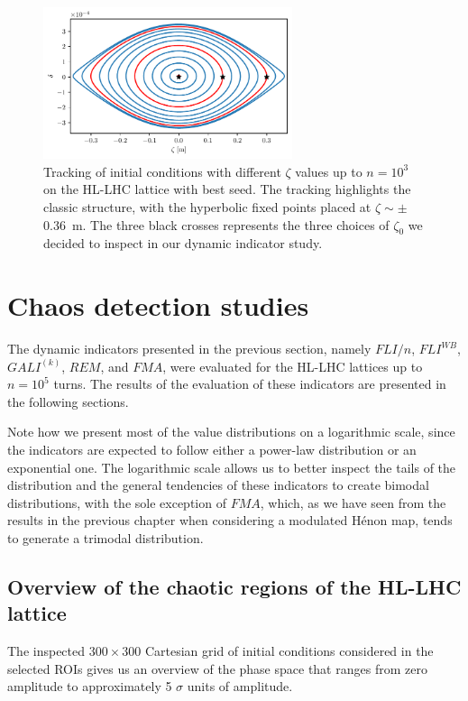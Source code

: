 \begin{figure}
    \centering
    \includegraphics[width=0.65\textwidth]{6_lhc_dynamic_indicators/figs/longitudinal.pdf}
    \caption{Tracking of initial conditions with different $\zeta$ values up to $n=10^3$ on the HL-LHC lattice with best seed. The tracking highlights the classic structure, with the hyperbolic fixed points placed at $\zeta \sim \pm$ \SI{0.36}{\meter}. The three black crosses represents the three choices of $\zeta_0$ we decided to inspect in our dynamic indicator study.}
    \label{fig:the_bunch}
\end{figure}

\section{Chaos detection studies} \label{sec:8:results}

The dynamic indicators presented in the previous section, namely $FLI/n$, $FLI^{WB}$, $GALI^{(k)}$, $REM$, and $FMA$, were evaluated for the HL-LHC lattices up to $n=10^5$ turns. The results of the evaluation of these indicators are presented in the following sections.

Note how we present most of the value distributions on a logarithmic scale, since the indicators are expected to follow either a power-law distribution or an exponential one. The logarithmic scale allows us to better inspect the tails of the distribution and the general tendencies of these indicators to create bimodal distributions, with the sole exception of $FMA$, which, as we have seen from the results in the previous chapter when considering a modulated Hénon map, tends to generate a trimodal distribution.

\subsection{Overview of the chaotic regions of the HL-LHC lattice}

The inspected $300\times300$ Cartesian grid of initial conditions considered in the selected ROIs gives us an overview of the phase space that ranges from zero amplitude to approximately 5 $\sigma$ units of amplitude.

